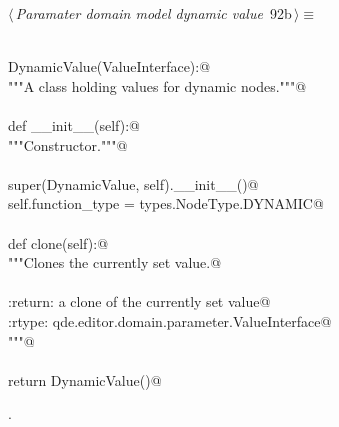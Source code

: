 \documentclass[
    a4paper,      %
    10pt,         %
    openright,    %
    notitlepage,  %
    parskip=half, %
]{scrreprt}       %
\theoremstyle{definition}                    %
\begin{document}
\begin{flushleft} \small
\begin{minipage}{\linewidth}\label{scrap151}\raggedright\small
{} $\langle\,${\itshape Paramater domain model dynamic value}\nobreak\ {\footnotesize {92b}}$\,\rangle\equiv$
\vspace{-1exm}
\begin{list}{}{} \item
\mbox{}\lstinline@@\\
\mbox{}\lstinline@class DynamicValue(ValueInterface):@\\
\mbox{}\lstinline@    """A class holding values for dynamic nodes."""@\\
\mbox{}\lstinline@@\\
\mbox{}\lstinline@    def __init__(self):@\\
\mbox{}\lstinline@        """Constructor."""@\\
\mbox{}\lstinline@@\\
\mbox{}\lstinline@        super(DynamicValue, self).__init__()@\\
\mbox{}\lstinline@        self.function_type = types.NodeType.DYNAMIC@\\
\mbox{}\lstinline@@\\
\mbox{}\lstinline@    def clone(self):@\\
\mbox{}\lstinline@        """Clones the currently set value.@\\
\mbox{}\lstinline@@\\
\mbox{}\lstinline@        :return: a clone of the currently set value@\\
\mbox{}\lstinline@        :rtype:  qde.editor.domain.parameter.ValueInterface@\\
\mbox{}\lstinline@        """@\\
\mbox{}\lstinline@@\\
\mbox{}\lstinline@        return DynamicValue()@{\NWsep}
\end{list}
\vspace{-1.5ex}
\footnotesize
\begin{list}{}{\setlength{\itemsep}{-\parsep}\setlength{\itemindent}{-\leftmargin}}
\item {\NWtxtMacroNoRef}.

\item{}
\end{list}
\end{minipage}\vspace{4ex}
\end{flushleft}
\end{document}
